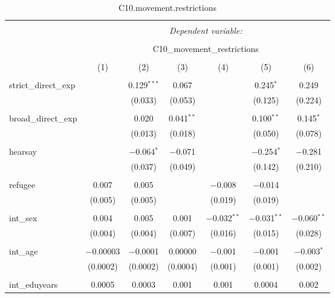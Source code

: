 
\begin{table}[H] \centering 
  \caption{C10.movement.restrictions} 
  \label{} 
\tiny 
\begin{tabular}{@{\extracolsep{4pt}}lcccccc} 
\\[-1.8ex]\hline 
\hline \\[-1.8ex] 
 & \multicolumn{6}{c}{\textit{Dependent variable:}} \\ 
\cline{2-7} 
\\[-1.8ex] & \multicolumn{6}{c}{C10\_movement\_restrictions} \\ 
\\[-1.8ex] & (1) & (2) & (3) & (4) & (5) & (6)\\ 
\hline \\[-1.8ex] 
 strict\_direct\_exp &  & 0.129$^{***}$ & 0.067 &  & 0.245$^{*}$ & 0.249 \\ 
  &  & (0.033) & (0.053) &  & (0.125) & (0.224) \\ 
  & & & & & & \\ 
 broad\_direct\_exp &  & 0.020 & 0.041$^{**}$ &  & 0.100$^{**}$ & 0.145$^{*}$ \\ 
  &  & (0.013) & (0.018) &  & (0.050) & (0.078) \\ 
  & & & & & & \\ 
 hearsay &  & $-$0.064$^{*}$ & $-$0.071 &  & $-$0.254$^{*}$ & $-$0.281 \\ 
  &  & (0.037) & (0.049) &  & (0.142) & (0.210) \\ 
  & & & & & & \\ 
 refugee & 0.007 & 0.005 &  & $-$0.008 & $-$0.014 &  \\ 
  & (0.005) & (0.005) &  & (0.019) & (0.019) &  \\ 
  & & & & & & \\ 
 int\_sex & 0.004 & 0.005 & 0.001 & $-$0.032$^{**}$ & $-$0.031$^{**}$ & $-$0.060$^{**}$ \\ 
  & (0.004) & (0.004) & (0.007) & (0.016) & (0.015) & (0.028) \\ 
  & & & & & & \\ 
 int\_age & $-$0.00003 & $-$0.0001 & 0.00000 & $-$0.001 & $-$0.001 & $-$0.003$^{*}$ \\ 
  & (0.0002) & (0.0002) & (0.0004) & (0.001) & (0.001) & (0.002) \\ 
  & & & & & & \\ 
 int\_eduyears & 0.0005 & 0.0003 & 0.001 & 0.001 & 0.0004 & 0.002 \\ 

\end{tabular}
\end{table}

